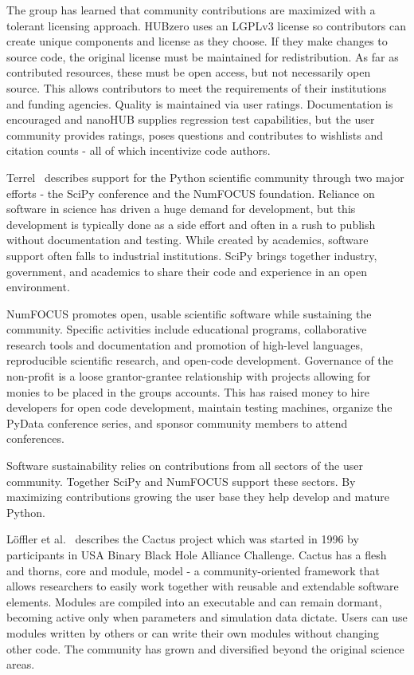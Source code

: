 \documentclass[11pt, oneside]{amsart}
\begin{document}
The group has learned that community contributions are maximized with a
tolerant licensing approach. HUBzero uses an LGPLv3 license so contributors can
create unique components and license as they choose. If they make changes to
source code, the original license must be maintained for redistribution. As far
as contributed resources, these must be open access, but not necessarily open
source. This allows contributors to meet the requirements of their institutions
and funding agencies. Quality is maintained via user ratings. Documentation is
encouraged and nanoHUB supplies regression test capabilities, but the user
community provides ratings, poses questions and contributes to wishlists and
citation counts - all of which incentivize code authors.

Terrel~\cite{Terrel_WSSSPE} describes support for the Python scientific community through
two major efforts - the SciPy conference and the NumFOCUS foundation. Reliance
on software in science has driven a huge demand for development, but this
development is typically done as a side effort and often in a rush to publish
without documentation and testing. While created by academics, software support
often falls to industrial institutions. SciPy brings together industry,
government, and academics to share their code and experience in an open
environment.

NumFOCUS promotes open, usable scientific software while sustaining the
community. Specific activities include educational programs, collaborative
research tools and documentation and promotion of high-level languages,
reproducible scientific research, and open-code development. Governance of the
non-profit is a loose grantor-grantee relationship with projects allowing for
monies to be placed in the groups accounts. This has raised money to hire
developers for open code development, maintain testing machines, organize the
PyData conference series, and sponsor community members to attend conferences.

Software sustainability relies on contributions from all sectors of the user
community. Together SciPy and NumFOCUS support these sectors. By maximizing
contributions growing the user base they help develop and mature Python.

L\"{o}ffler et al.~\cite{Loffler_WSSSPE} describes the Cactus project which was started in 1996 by
participants in USA Binary Black Hole Alliance Challenge. Cactus has a flesh
and thorns, core and module, model - a community-oriented framework that allows
researchers to easily work together with reusable and extendable software
elements. Modules are compiled into an executable and can remain dormant,
becoming active only when parameters and simulation data dictate. Users can
use modules written by others or can write their own modules without changing
other code. The community has grown and diversified beyond the original science
areas.
\end{document}
